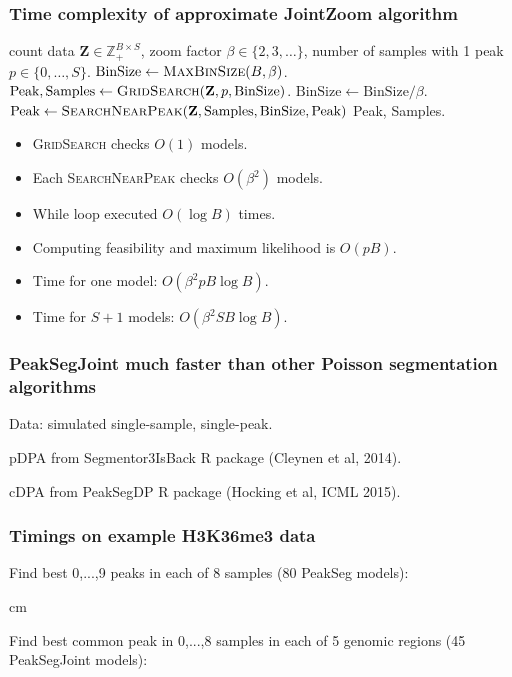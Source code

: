 \documentclass{beamer}
\newcommand{\ZZ}{\mathbb Z}
\begin{document}
\begin{frame}
  \frametitle{Time complexity of approximate JointZoom algorithm}

\begin{algorithmic}[1]
  \REQUIRE count data $\mathbf Z\in\ZZ_+^{B\times S}$, zoom factor
  $\beta\in\{2, 3, \dots\}$, number of samples with 1
  peak $p\in\{0, \dots, S\}$.
  \STATE $\textrm{BinSize} \gets \textsc{MaxBinSize}(B, \beta)$. 
  \STATE $\textrm{Peak}, \textrm{Samples} \gets \label{gridsearch}
  \textsc{GridSearch}(\mathbf Z, p, \textrm{BinSize})$.
  \STATE $\textrm{BinSize} \gets \textrm{BinSize} / \beta$. 
  \STATE $\textrm{Peak} \gets
  \textsc{SearchNearPeak}(\mathbf Z, \textrm{Samples}, \label{searchnear}
  \textrm{BinSize}, \textrm{Peak})$
  \ENDWHILE
  \RETURN \textrm{Peak}, \textrm{Samples}.
\end{algorithmic}

\begin{itemize}
\item \textsc{GridSearch} checks $O(1)$ models.
\item Each \textsc{SearchNearPeak} checks $O(\beta^2)$ models.
\item While loop executed $O(\log B)$ times.
\item Computing feasibility and maximum likelihood is $O(pB)$.
\item Time for one model: $O(\beta^2 pB\log B)$.
\item Time for $S+1$ models: $O(\beta^2 S B\log B)$.
\end{itemize}

\end{frame}

\begin{frame}
  \frametitle{PeakSegJoint much faster than other Poisson
    segmentation algorithms}

  Data: simulated single-sample, single-peak.

   

  pDPA from Segmentor3IsBack R package (Cleynen et al, 2014).

  cDPA from PeakSegDP R package (Hocking et al, ICML 2015).

\end{frame}

\begin{frame}
  \frametitle{Timings on example H3K36me3 data}

  \small

  Find best 0,...,9 peaks in each of 8 samples (80 PeakSeg
  models):

  \scriptsize

  

   cm

  \small

  Find best common peak in 0,...,8 samples in each of 5 genomic
  regions (45 PeakSegJoint models):

  \scriptsize

  

\end{frame}
\end{document}
